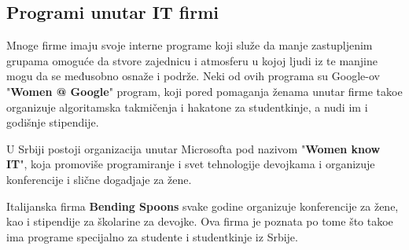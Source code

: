 \documentclass[12pt]{article}
\begin{document}
\subsection{Programi unutar IT firmi}

Mnoge firme imaju svoje interne programe koji služe da manje zastupljenim grupama omoguće da stvore zajednicu i atmosferu u kojoj ljudi iz te manjine mogu da se međusobno osnaže i podrže. Neki od ovih programa su Google-ov "\textbf{Women @ Google}" program, koji pored pomaganja ženama unutar firme tako\dj e organizuje algoritamska takmičenja i hakatone za studentkinje, a nudi im i godišnje stipendije.

U Srbiji postoji organizacija unutar Microsofta pod nazivom "\textbf{Women know IT}", koja promoviše programiranje i svet tehnologije devojkama i organizuje konferencije i slične dogadjaje za žene.

Italijanska firma \textbf{Bending Spoons} svake godine organizuje konferencije za žene, kao i stipendije za školarine za devojke. Ova firma je poznata po tome što tako\dj e ima programe specijalno za studente i studentkinje iz Srbije.
\end{document}
